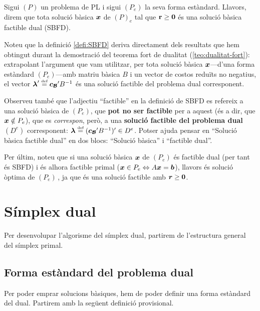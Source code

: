 \begin{defi}\label{defi:SBFD}
    Sigui $\left(P\right)$ un problema de PL i sigui $(P_e)$ la seva forma estàndard. Llavors, direm que tota solució bàsica $\boldsymbol{x}$ de $\left(P\right)_e$ tal que $\mathbf{r} \geq \boldsymbol{0}$ és una solució bàsica factible dual (SBFD).
\end{defi}

Noteu que la definició \ref{defi:SBFD} deriva directament dels resultats que hem obtingut durant la demostració del teorema fort de dualitat (\ref{teo:dualitat-fort}): extrapolant l'argument que vam utilitzar, per tota solució bàsica $\boldsymbol{x}$---d'una forma estàndard $(P_e)$---amb matriu bàsica $B$ i un vector de costos reduïts no negatius, el vector $\boldsymbol{\lambda}' \stackrel{\text{\tiny def}}{=} \boldsymbol{c_{\mathcal{B}}}' B^{-1}$ és una solució factible del problema dual corresponent.

Observeu també que l'adjectiu ``factible'' en la definició de SBFD es refereix a una solució bàsica de $(P_e)$, que \textbf{pot no ser factible} per a aquest (és a dir, que $\boldsymbol{x}\notin P_e$), que es \textit{correspon}, però, a una \textbf{solució factible del problema dual} $(D^e)$ corresponent: $\boldsymbol{\lambda} \stackrel{\text{\tiny def}}{=} (\boldsymbol{c_{\mathcal{B}}}' B^{-1})' \in D^e$. Potser ajuda pensar en ``Solució bàsica factible dual'' en dos blocs: ``Solució bàsica'' i ``factible dual''.

Per últim, noteu que si una solució bàsica $\boldsymbol{x}$ de $(P_e)$ és factible dual (per tant és SBFD) i és alhora factible primal ($\boldsymbol{x} \in P_e \Leftrightarrow A\boldsymbol{x} = \boldsymbol{b}$), llavors és solució òptima de $(P_e)\,$, ja que és una solució factible amb $\boldsymbol{r}\ge \boldsymbol{0}$.


\section{Símplex dual}

Per desenvolupar l'algorisme del símplex dual, partirem de l'estructura general del símplex primal. 


\subsection{Forma estàndard del problema dual}
Per poder emprar solucions bàsiques, hem de poder definir una forma estàndard del dual. Partirem amb la següent definició provisional.

